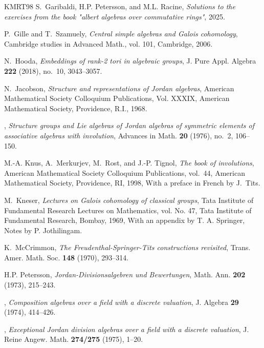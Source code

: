 \documentclass{amsart}
\theoremstyle{definition} %
\theoremstyle{remark} %
\renewcommand{\:}{\colon\,}
\numberwithin{equation}{section}
\begin{document}
\begin{thebibliography}{KMRT98}
S.~Garibaldi, H.P. Petersson, and M.L. Racine, \emph{Solutions to the exercises from the book "albert algebras over commutative rings"}, 2025.

P.~Gille and T.~Szamuely, \emph{Central simple algebras and {G}alois cohomology}, Cambridge studies in Advanced Math., vol. 101, Cambridge, 2006.

N.~Hooda, \emph{Embeddings of rank-2 tori in algebraic groups}, J. Pure Appl. Algebra \textbf{222} (2018), no.~10, 3043--3057. 

N.~Jacobson, \emph{Structure and representations of {J}ordan algebras}, American Mathematical Society Colloquium Publications, Vol. XXXIX, American Mathematical Society, Providence, R.I., 1968. 

\bysame, \emph{Structure groups and {L}ie algebras of {J}ordan algebras of symmetric elements of associative algebras with involution}, Advances in Math. \textbf{20} (1976), no.~2, 106--150. 

M.-A. Knus, A.~Merkurjev, M.~Rost, and J.-P. Tignol, \emph{The book of involutions}, American Mathematical Society Colloquium Publications, vol.~44, American Mathematical Society, Providence, RI, 1998, With a preface in French by J.\ Tits. 

M.~Kneser, \emph{Lectures on {G}alois cohomology of classical groups}, Tata Institute of Fundamental Research Lectures on Mathematics, vol. No. 47, Tata Institute of Fundamental Research, Bombay, 1969, With an appendix by T. A. Springer, Notes by P. Jothilingam. 

K.~McCrimmon, \emph{The {F}reudenthal-{S}pringer-{T}its constructions revisited}, Trans. Amer. Math. Soc. \textbf{148} (1970), 293--314. 

H.P. Petersson, \emph{Jordan-{D}ivisionsalgebren und {B}ewertungen}, Math. Ann. \textbf{202} (1973), 215--243. 

\bysame, \emph{Composition algebras over a field with a discrete valuation}, J. Algebra \textbf{29} (1974), 414--426. 

\bysame, \emph{Exceptional {J}ordan division algebras over a field with a discrete valuation}, J. Reine Angew. Math. \textbf{274/275} (1975), 1--20. 


\end{thebibliography}
\end{document}
